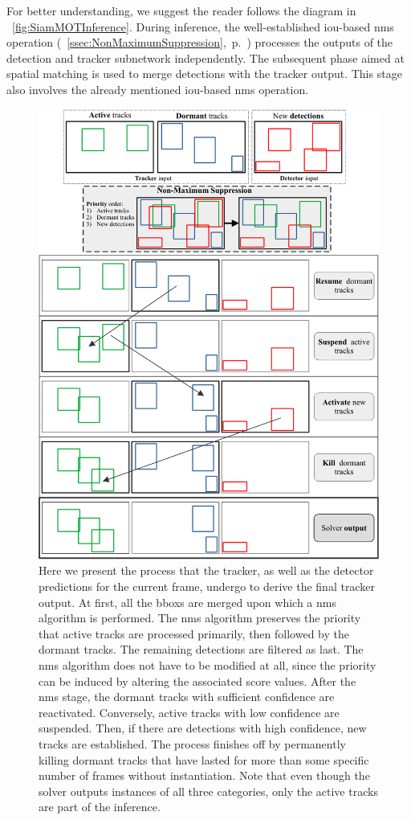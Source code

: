 For better understanding, we suggest the reader follows the diagram in \figtext{}~\ref{fig:SiamMOTInference}. During inference, the well-established \gls{iou}-based \gls{nms} operation (\sectiontext{}~\ref{ssec:NonMaximumSuppression},~p.~\pageref{ssec:NonMaximumSuppression}) processes the outputs of the detection and tracker subnetwork independently. The subsequent phase aimed at spatial matching is used to merge detections with the tracker output. This stage also involves the already mentioned \gls{iou}-based \gls{nms} operation.

\begin{figure}[!t]
    \centering
    \includegraphics[width=0.85\linewidth]{figures/siamese_tracking/siammot_online_solver.pdf}
    \caption[\gls{siammot} online solver]{Here we present the process that the tracker, as well as the detector predictions for the current frame, undergo to derive the final tracker output. At first, all the \glspl{bbox} are merged upon which a \gls{nms} algorithm is performed. The \gls{nms} algorithm preserves the priority that active tracks are processed primarily, then followed by the dormant tracks. The remaining detections are filtered as last. The \gls{nms} algorithm does not have to be modified at all, since the priority can be induced by altering the associated score values. After the \gls{nms} stage, the dormant tracks with sufficient confidence are reactivated. Conversely, active tracks with low confidence are suspended. Then, if there are detections with high confidence, new tracks are established. The process finishes off by permanently killing dormant tracks that have lasted for more than some specific number of frames without instantiation. Note that even though the solver outputs instances of all three categories, only the active tracks are part of the inference.}
    \label{fig:SiamMOTOnlineSolver}
\end{figure}
